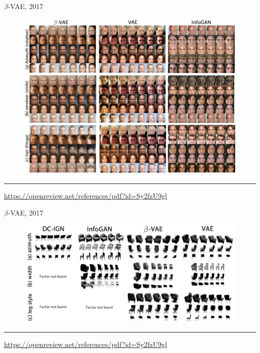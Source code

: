 \documentclass{beamer}
\begin{document}
\begin{frame}{$\beta$-VAE, 2017}
\begin{figure}
    \centering
    \includegraphics[width=0.95\linewidth]{figs/betaVAE_1.png}
\end{figure}
\vfill
\hrule\medskip
{\scriptsize \href{https://openreview.net/references/pdf?id=Sy2fzU9gl}{https://openreview.net/references/pdf?id=Sy2fzU9gl}}
\end{frame}
\begin{frame}{$\beta$-VAE, 2017}
\vspace{1cm}
\begin{figure}
    \centering
    \includegraphics[width=\linewidth]{figs/betaVAE_2.png}
\end{figure}
\vspace{1cm}
\vfill
\hrule\medskip
{\scriptsize \href{https://openreview.net/references/pdf?id=Sy2fzU9gl}{https://openreview.net/references/pdf?id=Sy2fzU9gl}}
\end{frame}
\end{document}

